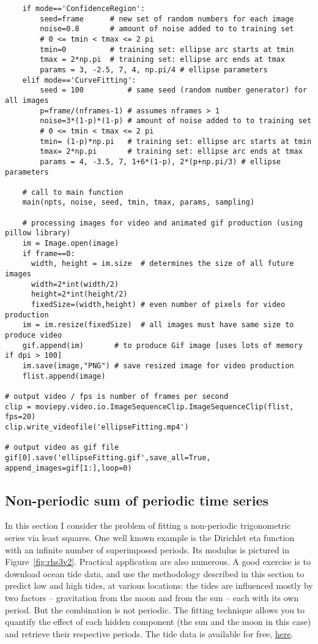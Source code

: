 \documentclass[oneside,10pt]{book}
\begin{document}
\begin{lstlisting}
    if mode=='ConfidenceRegion':
        seed=frame      # new set of random numbers for each image 
        noise=0.8       # amount of noise added to to training set
        # 0 <= tmin < tmax <= 2 pi
        tmin=0          # training set: ellipse arc starts at tmin
        tmax = 2*np.pi  # training set: ellipse arc ends at tmax
        params = 3, -2.5, 7, 4, np.pi/4 # ellipse parameters
    elif mode=='CurveFitting':
        seed = 100          # same seed (random number generator) for all images
        p=frame/(nframes-1) # assumes nframes > 1
        noise=3*(1-p)*(1-p) # amount of noise added to to training set
        # 0 <= tmin < tmax <= 2 pi
        tmin= (1-p)*np.pi   # training set: ellipse arc starts at tmin 
        tmax= 2*np.pi       # training set: ellipse arc ends at tmax  
        params = 4, -3.5, 7, 1+6*(1-p), 2*(p+np.pi/3) # ellipse parameters 

    # call to main function 
    main(npts, noise, seed, tmin, tmax, params, sampling)

    # processing images for video and animated gif production (using pillow library)
    im = Image.open(image)
    if frame==0:  
      width, height = im.size  # determines the size of all future images
      width=2*int(width/2)
      height=2*int(height/2)
      fixedSize=(width,height) # even number of pixels for video production 
    im = im.resize(fixedSize)  # all images must have same size to produce video
    gif.append(im)       # to produce Gif image [uses lots of memory if dpi > 100] 
    im.save(image,"PNG") # save resized image for video production
    flist.append(image)

# output video / fps is number of frames per second
clip = moviepy.video.io.ImageSequenceClip.ImageSequenceClip(flist, fps=20) 
clip.write_videofile('ellipseFitting.mp4')

# output video as gif file 
gif[0].save('ellipseFitting.gif',save_all=True, append_images=gif[1:],loop=0)    
\end{lstlisting}

\subsection{Non-periodic sum of periodic time series}

In this section I consider the problem of fitting a \textcolor{index}{non-periodic trigonometric series} via least squares. One  well known example 
is the Dirichlet eta function with an infinite number of superimposed periods. Its modulus is pictured in Figure~\ref{fig:rhs3v2}.
Practical application are also numerous. A good exercise
 is to download ocean tide data, and use the methodology described in this section to predict low and high tides, at various locations: the tides are influenced mostly by two factors --
 gravitation from the moon and from the sun -- each with its own period. But the combination is not periodic. The fitting technique allows you
 to quantify the effect of each hidden component (the sun and the moon in this case) and retrieve their respective periods. 
The tide data is available 
 for free, \href{https://tidesandcurrents.noaa.gov/}{here}.
\end{document}
